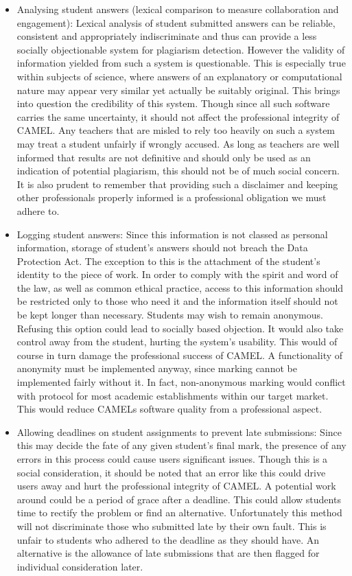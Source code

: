 	\begin{itemize}
		\item Analysing student answers (lexical comparison to measure collaboration and engagement): Lexical analysis of student submitted answers can be reliable, consistent and appropriately indiscriminate and thus can provide a less socially objectionable system for plagiarism detection.
			However the validity of information yielded from such a system is questionable. This is especially true within subjects of science, where answers of an explanatory or computational nature may appear very similar yet actually be suitably original. This brings into question the credibility of this system. Though since all such software carries the same uncertainty, it should not affect the professional integrity of CAMEL.
			Any teachers that are misled to rely too heavily on such a system may treat a student unfairly if wrongly accused. As long as teachers are well informed that results are not definitive and should only be used as an indication of potential plagiarism, this should not be of much social concern. It is also prudent to remember that providing such a disclaimer and keeping other professionals properly informed is a professional obligation we must adhere to.

		\item Logging student answers: Since this information is not classed as personal information, storage of student’s answers should not breach the Data Protection Act. The exception to this is the attachment of the student’s identity to the piece of work. In order to comply with the spirit and word of the law, as well as common ethical practice, access to this information should be restricted only to those who need it and the information itself should not be kept longer than necessary.
			Students may wish to remain anonymous. Refusing this option could lead to socially based objection. It would also take control away from the student, hurting the system’s usability. This would of course in turn damage the professional success of CAMEL.
			A functionality of anonymity must be implemented anyway, since marking cannot be implemented fairly without it. In fact, non-anonymous marking would conflict with protocol for most academic establishments within our target market. This would reduce CAMELs software quality from a professional aspect.

		\item Allowing deadlines on student assignments to prevent late submissions: Since this may decide the fate of any given student’s final mark, the presence of any errors in this process could cause users significant issues.
			Though this is a social consideration, it should be noted that an error like this could drive users away and hurt the professional integrity of CAMEL.
			A potential work around could be a period of grace after a deadline. This could allow students time to rectify the problem or find an alternative. Unfortunately this method will not discriminate those who submitted late by their own fault. This is unfair to students who adhered to the deadline as they should have.
			An alternative is the allowance of late submissions that are then flagged for individual consideration later.
	\end{itemize}
